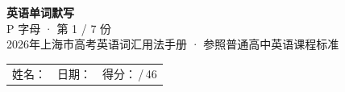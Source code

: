 \documentclass[10pt,a4paper]{article}
\begin{document}
\pagestyle{plain}

\begin{center}
{\LARGE\bfseries 英语单词默写}\\[0.22em]
{\large P 字母 · 第 1 / 7 份}\\[0.18em]
{\small 2026年上海市高考英语词汇用法手册 · 参照普通高中英语课程标准}
\end{center}

\vspace{0.25em}
\noindent\begin{tabular}{@{}p{}@{}p{}@{}p{}@{}}
姓名：\underline{\hspace{2.0cm}} & 日期：\underline{\hspace{2.0cm}} & 得分：\underline{\hspace{1.3cm}}\,/\,46 \\
\end{tabular}

\vspace{0.3em}

\vspace{0.08em}
\end{document}
